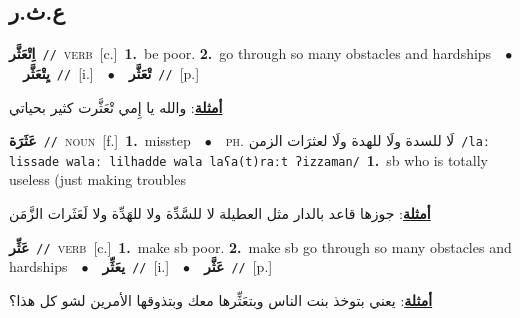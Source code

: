 \documentclass[10pt,a4paper,twoside]{article} %
\begin{document}
\begin{multicols}{2}
{{{{{{{{{{{{\vspace{-3mm}
\subsection*{\color{blue}\foreignlanguage{arabic}{ع.ث.ر}\color{blue}{}} 

{\setlength\topsep{0pt}\textbf{\foreignlanguage{arabic}{اِتْعَثَّر}}\ {\color{gray}\texttt{//}\color{black}}\ \textsc{verb}\ [c.]\ \textbf{1.}~be poor.  \textbf{2.}~go through so many obstacles and hardships\ \ $\bullet$\ \ \setlength\topsep{0pt}\textbf{\foreignlanguage{arabic}{يِتْعَثَّر}}\ {\color{gray}\texttt{//}\color{black}}\ [i.]\ \ $\bullet$\ \ \setlength\topsep{0pt}\textbf{\foreignlanguage{arabic}{تْعَثَّر}}\ {\color{gray}\texttt{//}\color{black}}\ [p.]\  \begin{flushright}\color{gray}\foreignlanguage{arabic}{\textbf{\underline{\foreignlanguage{arabic}{أمثلة}}}: والله يا إِمي تْعَثَّرت كثير بحياتي}\end{flushright}\color{black}} \vspace{2mm}

{\setlength\topsep{0pt}\textbf{\foreignlanguage{arabic}{عَثَرَة}}\ {\color{gray}\texttt{//}\color{black}}\ \textsc{noun}\ [f.]\ \textbf{1.}~misstep\ \ $\bullet$\ \ \textsc{ph.} \color{gray} \foreignlanguage{arabic}{لَا للسدة ولَا للهدة ولَا لعثرَات الزمن}\color{black}\ {\color{gray}\texttt{/{\sffamily laː lissade walaː lilhadde wala laʕa(t)raːt ʔizzaman}/}\color{black}}\ \textbf{1.}~sb who is totally useless (just making troubles\  \begin{flushright}\color{gray}\foreignlanguage{arabic}{\textbf{\underline{\foreignlanguage{arabic}{أمثلة}}}: جوزها قاعد بالدار مثل العطيلة لا للسَّدِّة ولا للهَدِّة ولا لَعَثَرات الزَّمَن}\end{flushright}\color{black}} \vspace{2mm}

{\setlength\topsep{0pt}\textbf{\foreignlanguage{arabic}{عَثِّر}}\ {\color{gray}\texttt{//}\color{black}}\ \textsc{verb}\ [c.]\ \textbf{1.}~make sb poor.  \textbf{2.}~make sb go through so many obstacles and hardships\ \ $\bullet$\ \ \setlength\topsep{0pt}\textbf{\foreignlanguage{arabic}{يعَثِّر}}\ {\color{gray}\texttt{//}\color{black}}\ [i.]\ \ $\bullet$\ \ \setlength\topsep{0pt}\textbf{\foreignlanguage{arabic}{عَثَّر}}\ {\color{gray}\texttt{//}\color{black}}\ [p.]\  \begin{flushright}\color{gray}\foreignlanguage{arabic}{\textbf{\underline{\foreignlanguage{arabic}{أمثلة}}}: يعني بتوخذ بنت الناس وبتعَثِّرها معك وبتذوقها الأمرين لشو كل هذا؟}\end{flushright}\color{black}} \vspace{2mm}

}}}}}}}}}}}}
\end{multicols}
\end{document}
